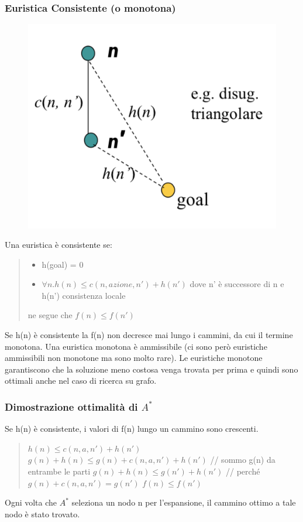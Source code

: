 \documentclass{article}
\begin{document}
\subsubsection{Euristica Consistente (o monotona)}
\begin{figure}[H]
    \centering
    \includegraphics[scale=0.5]{Images/eurconsist.png}
\end{figure}
Una euristica è consistente se:
\begin{quote}
    \begin{itemize}
    \item h(goal) = 0
    \item $\forall n . h(n) \leq c(n,azione,n')+h(n')$ dove n' è successore di n e h(n') consistenza locale
    \end{itemize}
    ne segue che $f(n) \leq f(n')$
\end{quote}
Se h(n) è consistente la f(n) non decresce mai lungo i cammini, da cui il termine monotona. \newline
Una euristica monotona è ammissibile (ci sono però euristiche ammissibili non monotone ma sono molto rare). Le euristiche monotone garantiscono che la soluzione meno costosa venga trovata per prima e quindi sono ottimali anche nel caso di ricerca su grafo.

\subsubsection{Dimostrazione ottimalità di $A^*$}
Se h(n) è consistente, i valori di f(n) lungo un cammino sono crescenti.
\begin{quote}
    $h(n) \leq c(n,a,n')+h(n')$ \newline
    $g(n) + h(n) \leq g(n) + c(n,a,n')+h(n')$ // sommo g(n) da entrambe le parti\newline
    $g(n) + h(n) \leq g(n')+h(n')$ // perché $g(n) + c(n,a,n') = g(n')$ \newline
    $f(n) \leq f(n')$
\end{quote}
Ogni volta che $A^*$ seleziona un nodo n per l'espansione, il cammino ottimo a tale nodo è stato trovato.
\end{document}
